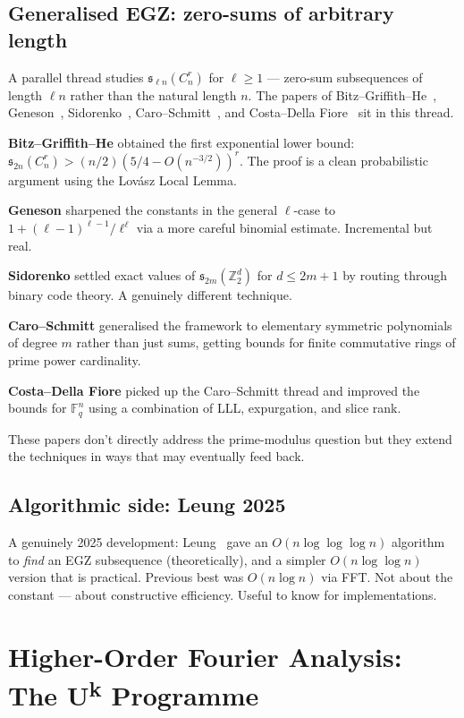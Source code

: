\documentclass[11pt,a4paper]{article}
\theoremstyle{plain}
\theoremstyle{definition}
\theoremstyle{remark}
\newcommand{\F}{\mathbb{F}}
\newcommand{\Z}{\mathbb{Z}}
\newcommand{\sUFp}{\mathfrak{s}}
\begin{document}
\subsection{Generalised EGZ: zero-sums of arbitrary length}

A parallel thread studies $\sUFp_{\ell n}(C_n^r)$ for $\ell \geq 1$ --- zero-sum subsequences of length $\ell n$ rather than the natural length $n$. The papers of Bitz--Griffith--He~\cite{bitzgriffithhe2017}, Geneson~\cite{geneson2020}, Sidorenko~\cite{sidorenko2020}, Caro--Schmitt~\cite{caroschmitt2022}, and Costa--Della Fiore~\cite{costadellafiore2022} sit in this thread.

\textbf{Bitz--Griffith--He} obtained the first exponential lower bound: $\sUFp_{2n}(C_n^r) > (n/2)(5/4 - O(n^{-3/2}))^r$. The proof is a clean probabilistic argument using the Lov\'asz Local Lemma.

\textbf{Geneson} sharpened the constants in the general $\ell$-case to $1 + (\ell-1)^{\ell-1}/\ell^\ell$ via a more careful binomial estimate. Incremental but real.

\textbf{Sidorenko} settled exact values of $\sUFp_{2m}(\Z_2^d)$ for $d \leq 2m + 1$ by routing through binary code theory. A genuinely different technique.

\textbf{Caro--Schmitt} generalised the framework to elementary symmetric polynomials of degree $m$ rather than just sums, getting bounds for finite commutative rings of prime power cardinality.

\textbf{Costa--Della Fiore} picked up the Caro--Schmitt thread and improved the bounds for $\F_q^n$ using a combination of LLL, expurgation, and slice rank.

These papers don't directly address the prime-modulus question but they extend the techniques in ways that may eventually feed back.

\subsection{Algorithmic side: Leung 2025}

A genuinely 2025 development: Leung~\cite{leung2025} gave an $O(n \log \log \log n)$ algorithm to \emph{find} an EGZ subsequence (theoretically), and a simpler $O(n \log \log n)$ version that is practical. Previous best was $O(n \log n)$ via FFT. Not about the constant --- about constructive efficiency. Useful to know for implementations.

\section{Higher-Order Fourier Analysis: The U\textsuperscript{k} Programme}
\end{document}
